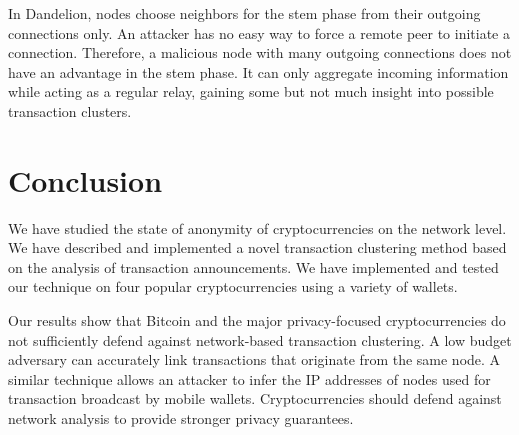 In Dandelion, nodes choose neighbors for the stem phase from their outgoing connections only.
An attacker has no easy way to force a remote peer to initiate a connection.
Therefore, a malicious node with many outgoing connections does not have an advantage in the stem phase.
It can only aggregate incoming information while acting as a regular relay, gaining some but not much insight into possible transaction clusters.


\section{Conclusion} \label{sec:Ch03Conclusion}

We have studied the state of anonymity of cryptocurrencies on the network level.
We have described and implemented a novel transaction clustering method based on the analysis of transaction announcements.
We have implemented and tested our technique on four popular cryptocurrencies using a variety of wallets.

Our results show that Bitcoin and the major privacy-focused cryptocurrencies do not sufficiently defend against network-based transaction clustering.
A low budget adversary can accurately link transactions that originate from the same node.
A similar technique allows an attacker to infer the IP addresses of nodes used for transaction broadcast by mobile wallets.
Cryptocurrencies should defend against network analysis to provide stronger privacy guarantees.
